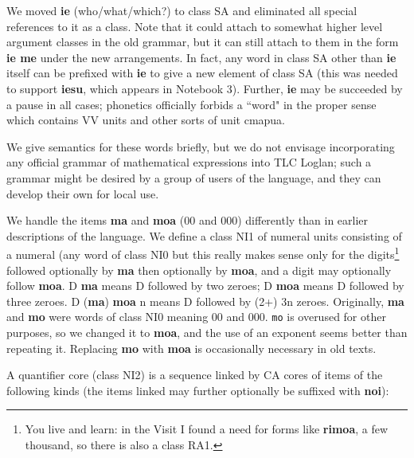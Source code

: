\documentclass[12pt]{book}
\begin{document}
We moved {\bf ie} (who/what/which?) to class SA and eliminated all special references to it as a class.  Note that it could attach to somewhat higher level argument classes in the old grammar, but it can still attach to them in the form {\bf ie me} under the new arrangements.  In fact, any word in class SA other than {\bf ie} itself can be prefixed with {\bf ie} to give a new element of class SA (this was needed to support {\bf iesu}, which appears in Notebook 3).  Further, {\bf ie} may be succeeded by a pause in all cases;  phonetics officially forbids a ``word" in the proper sense which
contains VV units and other sorts of unit cmapua.

We give semantics for these words briefly, but we do not envisage incorporating any official grammar of mathematical expressions into TLC Loglan; such a grammar might be desired by a group of users of the language, and they can develop their own for local use.

We handle the items {\bf ma} and {\bf moa} (00 and 000) differently than in earlier descriptions of the language.  We define a class NI1 of numeral units consisting of a numeral (any word of class NI0 but this really makes
sense only for the digits\footnote{You live and learn:  in the Visit I found a need for forms like {\bf rimoa}, a few thousand, so there is also a class RA1.} followed optionally by {\bf ma} then optionally by {\bf moa}, and a digit may optionally follow {\bf moa}.   D {\bf ma} means D followed by two zeroes;  D {\bf moa} means D followed
by three zeroes.   D ({\bf ma}) {\bf moa} n means D followed by (2+) 3n zeroes.   Originally, {\bf ma} and {\bf mo} were words of class NI0 meaning 00 and 000.   {\tt mo} is overused for other purposes, so we changed it to {\bf moa}, and the use of an exponent seems better than repeating it.   Replacing {\bf mo} with {\bf moa} is occasionally necessary in old texts.

A quantifier core (class NI2) is a sequence linked by CA cores of items of the following kinds (the items linked may further optionally be suffixed with {\bf noi}):
\end{document}
